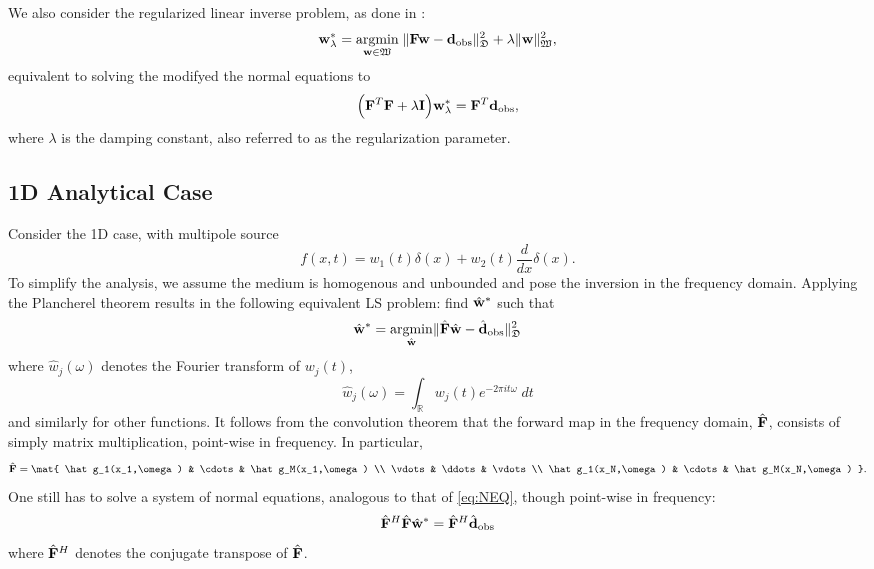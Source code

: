 We also consider the regularized linear inverse problem, as done in \cite{Koch:91}:
\begin{equation}\label{eq:FWIreg}
	\mathbf w^*_{\lambda} = \underset{\mathbf w\in\mathfrak W}{\text{argmin}} \; \| \mathbf F \mathbf w - \mathbf d_{\rm obs}\|^2_{\mathfrak D} + \lambda \| \mathbf w\|^2_{\mathfrak W},
\end{equation}
equivalent to solving the modifyed the normal equations to
\begin{equation}\label{eq:RegNEQ}
	\Big( \mathbf F^T \mathbf F + \lambda\mathbf I\Big) \mathbf w^*_{\lambda} = \mathbf F^T \mathbf d_{\rm obs},
\end{equation}
where $\lambda$ is the damping constant, also referred to as the regularization parameter.


\subsection{1D Analytical Case}

Consider the 1D case, with multipole source
\begin{equation}\label{eq:1Ddipole}
	f(x,t) = w_1(t)\delta(x) + w_2(t) \frac{d}{dx}\delta(x).
\end{equation}
To simplify the analysis, we assume the medium is homogenous and unbounded and pose the inversion in the frequency domain.
Applying the Plancherel theorem results in the following equivalent LS problem: find $\hat{\mathbf{w}}^*$ such that
\[
	\hat{\mathbf{w}}^* = \underset{\hat{\mathbf{w}}}{\rm argmin} \| \hat{\mathbf{F}}\hat{\mathbf{w}} - \hat{\mathbf{d}}_{\rm obs}\|^2_{\mathfrak D}
\]
where $\hat w_j(\omega)$ denotes the Fourier transform of $w_j(t)$,
\[
	\hat w_j(\omega) = \int_{\mathbb R} w_j(t) e^{-2\pi i t \omega} \; dt
\]
and similarly for other functions.
It follows from the convolution theorem that the forward map in the frequency domain, $\hat{\mathbf{F}}$, consists of simply matrix multiplication, point-wise in frequency.
In particular,
\[
	\bhat F = \mat{ \hat g_1(x_1,\omega) & \cdots & \hat g_M(x_1,\omega) \\
			        \vdots & \ddots & \vdots \\
			        \hat g_1(x_N,\omega) & \cdots & \hat g_M(x_N,\omega) }.
\]
One still has to solve a system of normal equations, analogous to that of \ref{eq:NEQ}, though point-wise in frequency:
\[
	\hat{\mathbf{F}}^H\hat{\mathbf{F}} \hat{\mathbf{w}}^* = \hat{\mathbf{F}}^H \hat{\mathbf{d}}_{\rm obs}
\]
where $\hat{\mathbf{F}}^H$ denotes the conjugate transpose of $\hat{\mathbf{F}}$.


